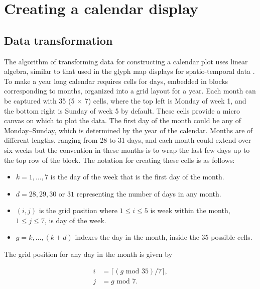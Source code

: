 \documentclass[12pt]{article}
\providecommand{\tightlist}{%
  \setlength{\itemsep}{0pt}\setlength{\parskip}{0pt}}
\begin{document}
\hypertarget{creating-a-calendar-display}{%
\section{Creating a calendar
display}\label{creating-a-calendar-display}}

\label{sec:algorithm}

\hypertarget{data-transformation}{%
\subsection{Data transformation}\label{data-transformation}}

\label{sec:transformation}

The algorithm of transforming data for constructing a calendar plot uses
linear algebra, similar to that used in the glyph map displays for
spatio-temporal data \citep{Wickham2012glyph}. To make a year long
calendar requires cells for days, embedded in blocks corresponding to
months, organized into a grid layout for a year. Each month can be
captured with 35 (5 \(\times\) 7) cells, where the top left is Monday of
week 1, and the bottom right is Sunday of week 5 by default. These cells
provide a micro canvas on which to plot the data. The first day of the
month could be any of Monday--Sunday, which is determined by the year of
the calendar. Months are of different lengths, ranging from 28 to 31
days, and each month could extend over six weeks but the convention in
these months is to wrap the last few days up to the top row of the
block. The notation for creating these cells is as follows:

\begin{itemize}
\tightlist
\item
  \(k = 1, \dots , 7\) is the day of the week that is the first day of
  the month.
\item
  \(d = 28, 29, 30\) or \(31\) representing the number of days in any
  month.
\item
  \((i, j)\) is the grid position where \(1 \le i \le 5\) is week within
  the month, \(1 \le j \le 7\), is day of the week.
\item
  \(g = k, \dots,(k+d)\) indexes the day in the month, inside the 35
  possible cells.
\end{itemize}

The grid position for any day in the month is given by

\begin{equation}
  \begin{aligned}
  i &= \lceil (g \text{ mod } 35) / 7\rceil, \\
  j &= g \text{ mod } 7. \label{eq:grid}
  \end{aligned}
\end{equation}
\end{document}

